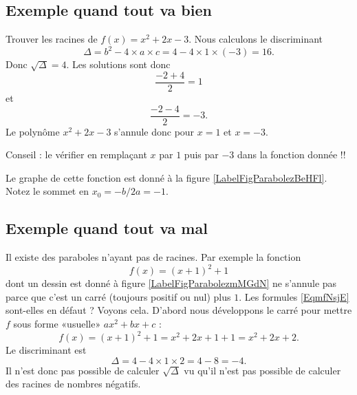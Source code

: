 \subsection{Exemple quand tout va bien}

\begin{example} \label{ExgMRBJJ}
    Trouver les racines de \( f(x)=x^2+2x-3\). Nous calculons le discriminant
    \begin{equation}
        \Delta=b^2-4\times a\times c=4-4\times 1\times (-3)=16.
    \end{equation}
    Donc \( \sqrt{\Delta}=4\). Les solutions sont donc
    \begin{equation}
        \frac{ -2+4 }{ 2 }=1
    \end{equation}
    et
    \begin{equation}
        \frac{ -2-4 }{ 2 }=-3.
    \end{equation}
    Le polynôme \( x^2+2x-3\) s'annule donc pour \( x=1\) et \( x=-3\).

    Conseil : le vérifier en remplaçant \( x\) par \( 1\) puis par \( -3\) dans la fonction donnée !!

    Le graphe de cette fonction est donné à la figure \ref{LabelFigParabolezBeHFl}. Notez le sommet en \( x_0=-b/2a=-1\).
    \newcommand{\CaptionFigParabolezBeHFl}{Graphe de la fonction \( f(x)=x^2+2x-3\) pour l'exemple \ref{ExgMRBJJ}.}

\end{example}

\subsection{Exemple quand tout va mal}

\newcommand{\CaptionFigParabolezmMGdN}{La parabole \( (x+1)^2+1\)}

Il existe des paraboles n'ayant pas de racines. Par exemple la fonction
\begin{equation}
    f(x)=(x+1)^2+1
\end{equation}
dont un dessin est donné à figure \ref{LabelFigParabolezmMGdN} ne s'annule pas parce que c'est un carré (toujours positif ou nul) plus \( 1\). Les formules \eqref{EqmfNsjE} sont-elles en défaut ? Voyons cela. D'abord nous développons le carré pour mettre \( f\) sous forme «usuelle» \( ax^2+bx+c\) :
\begin{equation}
    f(x)=(x+1)^2+1=x^2+2x+1+1=x^2+2x+2.
\end{equation}
Le discriminant est
\begin{equation}
    \Delta=4-4\times 1\times 2=4-8=-4.
\end{equation}
Il n'est donc pas possible de calculer \( \sqrt{\Delta}\) vu qu'il n'est pas possible de calculer des racines de nombres négatifs.

